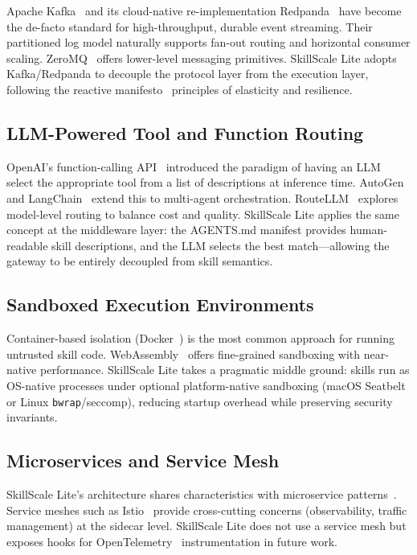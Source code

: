 \documentclass[sigconf,nonacm]{acmart}
\begin{document}
Apache Kafka~\cite{kafka2011} and its cloud-native re-implementation Redpanda~\cite{redpanda2022} have become the de-facto standard for high-throughput, durable event streaming. Their partitioned log model naturally supports fan-out routing and horizontal consumer scaling. ZeroMQ~\cite{zeromq2013} offers lower-level messaging primitives. SkillScale Lite adopts Kafka/Redpanda to decouple the protocol layer from the execution layer, following the reactive manifesto~\cite{reactive2014} principles of elasticity and resilience.

\subsection{LLM-Powered Tool and Function Routing}

OpenAI's function-calling API~\cite{openai_function_calling} introduced the paradigm of having an LLM select the appropriate tool from a list of descriptions at inference time. AutoGen~\cite{autogen2023} and LangChain~\cite{langchain2022} extend this to multi-agent orchestration. RouteLLM~\cite{llmrouter2024} explores model-level routing to balance cost and quality. SkillScale Lite applies the same concept at the middleware layer: the AGENTS.md manifest provides human-readable skill descriptions, and the LLM selects the best match---allowing the gateway to be entirely decoupled from skill semantics.

\subsection{Sandboxed Execution Environments}

Container-based isolation (Docker~\cite{docker2014}) is the most common approach for running untrusted skill code. WebAssembly~\cite{wasm2019} offers fine-grained sandboxing with near-native performance. SkillScale Lite takes a pragmatic middle ground: skills run as OS-native processes under optional platform-native sandboxing (macOS Seatbelt or Linux \texttt{bwrap}/seccomp), reducing startup overhead while preserving security invariants.

\subsection{Microservices and Service Mesh}

SkillScale Lite's architecture shares characteristics with microservice patterns~\cite{microservices2014}. Service meshes such as Istio~\cite{servicemesh2017} provide cross-cutting concerns (observability, traffic management) at the sidecar level. SkillScale Lite does not use a service mesh but exposes hooks for OpenTelemetry~\cite{opentelemetry2021} instrumentation in future work.
\end{document}
